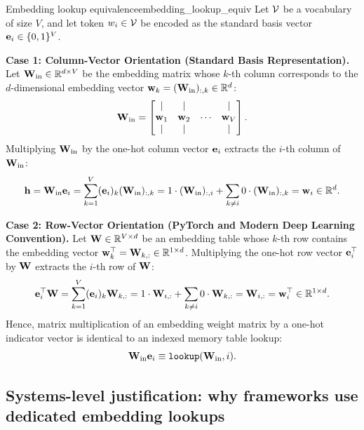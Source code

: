 \documentclass[../../main.tex]{subfiles}
\begin{document}
\begin{theorem}{Embedding lookup equivalence}{embedding_lookup_equiv}
Let $\mathcal{V}$ be a vocabulary of size $V$, and let token $w_i \in \mathcal{V}$ be encoded as the standard basis vector $\mathbf{e}_i \in \{0, 1\}^V$.

\noindent\textbf{Case 1: Column-Vector Orientation (Standard Basis Representation).}  
Let $\mathbf{W}_{\text{in}} \in \mathbb{R}^{d \times V}$ be the embedding matrix whose $k$-th column corresponds to the $d$-dimensional embedding vector $\mathbf{w}_k = (\mathbf{W}_{\text{in}})_{:, k} \in \mathbb{R}^d$:
\begin{equation}
\label{eq:win_column_blocks}
\mathbf{W}_{\text{in}} = \begin{bmatrix} \vert & \vert & & \vert \\ \mathbf{w}_1 & \mathbf{w}_2 & \cdots & \mathbf{w}_V \\ \vert & \vert & & \vert \end{bmatrix}.
\end{equation}
Multiplying $\mathbf{W}_{\text{in}}$ by the one-hot column vector $\mathbf{e}_i$ extracts the $i$-th column of $\mathbf{W}_{\text{in}}$:
\begin{equation}
\label{eq:column_lookup_proof}
\mathbf{h} = \mathbf{W}_{\text{in}} \mathbf{e}_i = \sum_{k=1}^V (\mathbf{e}_i)_k (\mathbf{W}_{\text{in}})_{:, k} = 1 \cdot (\mathbf{W}_{\text{in}})_{:, i} + \sum_{k \neq i} 0 \cdot (\mathbf{W}_{\text{in}})_{:, k} = \mathbf{w}_i \in \mathbb{R}^d.
\end{equation}

\noindent\textbf{Case 2: Row-Vector Orientation (PyTorch and Modern Deep Learning Convention).}  
Let $\mathbf{W} \in \mathbb{R}^{V \times d}$ be an embedding table whose $k$-th row contains the embedding vector $\mathbf{w}_k^\top = \mathbf{W}_{k, :} \in \mathbb{R}^{1 \times d}$. Multiplying the one-hot row vector $\mathbf{e}_i^\top$ by $\mathbf{W}$ extracts the $i$-th row of $\mathbf{W}$:
\begin{equation}
\label{eq:row_lookup_proof}
\mathbf{e}_i^\top \mathbf{W} = \sum_{k=1}^V (\mathbf{e}_i)_k \mathbf{W}_{k, :} = 1 \cdot \mathbf{W}_{i, :} + \sum_{k \neq i} 0 \cdot \mathbf{W}_{k, :} = \mathbf{W}_{i, :} = \mathbf{w}_i^\top \in \mathbb{R}^{1 \times d}.
\end{equation}
Hence, matrix multiplication of an embedding weight matrix by a one-hot indicator vector is identical to an indexed memory table lookup:
\begin{equation}
\label{eq:lookup_linear_identity}
\mathbf{W}_{\text{in}} \mathbf{e}_i \equiv \text{\texttt{lookup}}(\mathbf{W}_{\text{in}}, i).
\end{equation}
\end{theorem}

\subsection{Systems-level justification: why frameworks use dedicated embedding lookups}
\label{subsec:systems_embedding_justification}
\end{document}
